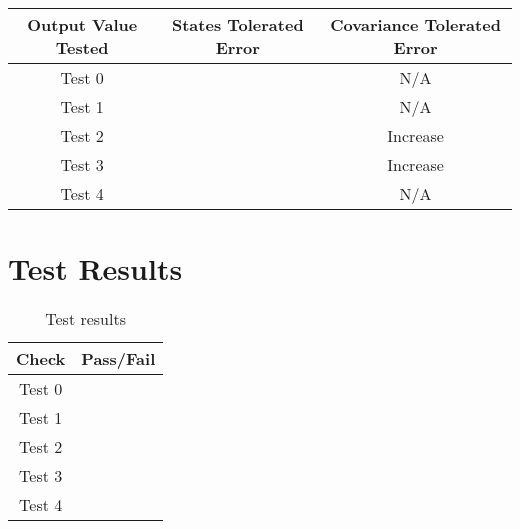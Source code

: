 \begin{table}[ht]
\centering
\begin{tabular}{c|cc}
\hline
\hline
\textbf{Output Value Tested}     & \textbf{States Tolerated Error} & \textbf{Covariance Tolerated Error} \\ \hline
Test 0	        &         		 &  N/A                   \\
Test 1	        &         		 &  N/A                   \\
Test 2	   &      			 &  Increase                           \\
Test 3	     &      			 &  Increase                    \\
Test 4	 &      			 &  N/A            		     \\\hline
\end{tabular}
\end{table}

\section{Test Results}

\begin{table}[H]
	\caption{Test results}
	\label{tab:results}
	\centering \fontsize{10}{10}\selectfont
	\begin{tabular}{c | c}
		\hline\hline
		\textbf{Check} 			&\textbf{Pass/Fail} \\ 
		\hline
	   Test 0	   			&  \\ 
	   Test 1	   			&  \\ 
	   Test 2	   			&  \\ 
	   Test 3	   			&  \\ 
	   Test 4	   			&  \\ 
	   \hline\hline
	\end{tabular}
\end{table}

